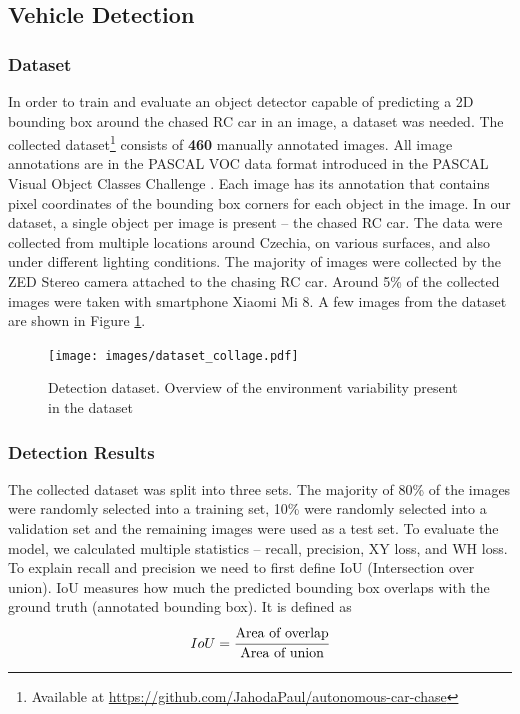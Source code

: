 \documentclass{ctuthesis/ctuthesis}
\begin{document}
\subsection{Vehicle Detection}
\subsubsection{Dataset} \label{s:detection_dataset}
In order to train and evaluate an object detector capable of predicting a 2D bounding box around the chased RC car in an image, a dataset was needed. The collected dataset\footnote{Available at \href{https://github.com/JahodaPaul/autonomous-car-chase}{https://github.com/JahodaPaul/autonomous-car-chase}} consists of \textbf{460} manually annotated images. All image annotations are in the PASCAL VOC data format introduced in the PASCAL Visual Object Classes Challenge \cite{pascal-voc}. Each image has its annotation that contains pixel coordinates of the bounding box corners for each object in the image. In our dataset, a single object per image is present -- the chased RC car. The data were collected from multiple locations around Czechia, on various surfaces, and also under different lighting conditions. The majority of images were collected by the ZED Stereo camera attached to the chasing RC car. Around 5\% of the collected images were taken with smartphone Xiaomi Mi 8. A few images from the dataset are shown in Figure \ref{f:dataset_detection}.

\begin{figure}[]
    \centering
    \texttt{[image: images/dataset\_collage.pdf]}
    
    \caption{Detection dataset. Overview of the environment variability present in the dataset}\label{f:dataset_detection}
\end{figure}


\subsubsection{Detection Results}
The collected dataset was split into three sets. The majority of 80\% of the images were randomly selected into a training set, 10\% were randomly selected into a validation set and the remaining images were used as a test set. To evaluate the model, we calculated multiple statistics -- recall, precision, XY loss, and WH loss. To explain recall and precision we need to first define IoU (Intersection over union). IoU measures how much the predicted bounding box overlaps with the ground truth (annotated bounding box). It is defined as 
\begin{equation}IoU = \cfrac{\textrm{Area of overlap}}{\textrm{Area of union}}\end{equation}
\end{document}
